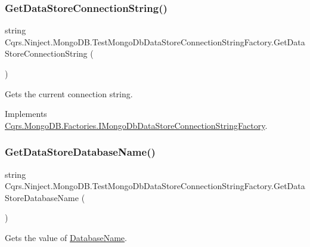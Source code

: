 \subsubsection{\texorpdfstring{Get\+Data\+Store\+Connection\+String()}{GetDataStoreConnectionString()}}
{\footnotesize\ttfamily string Cqrs.\+Ninject.\+Mongo\+D\+B.\+Test\+Mongo\+Db\+Data\+Store\+Connection\+String\+Factory.\+Get\+Data\+Store\+Connection\+String (\begin{DoxyParamCaption}{ }\end{DoxyParamCaption})}



Gets the current connection string. 



Implements \hyperlink{interfaceCqrs_1_1MongoDB_1_1Factories_1_1IMongoDbDataStoreConnectionStringFactory_a31cb87fb2cf1435912f635394494ed91_a31cb87fb2cf1435912f635394494ed91}{Cqrs.\+Mongo\+D\+B.\+Factories.\+I\+Mongo\+Db\+Data\+Store\+Connection\+String\+Factory}.

\mbox{\label{classCqrs_1_1Ninject_1_1MongoDB_1_1TestMongoDbDataStoreConnectionStringFactory_a9ef0515d08d9a309fcfef00b15dad8cf_a9ef0515d08d9a309fcfef00b15dad8cf}} 
\subsubsection{\texorpdfstring{Get\+Data\+Store\+Database\+Name()}{GetDataStoreDatabaseName()}}
{\footnotesize\ttfamily string Cqrs.\+Ninject.\+Mongo\+D\+B.\+Test\+Mongo\+Db\+Data\+Store\+Connection\+String\+Factory.\+Get\+Data\+Store\+Database\+Name (\begin{DoxyParamCaption}{ }\end{DoxyParamCaption})}



Gets the value of \hyperlink{classCqrs_1_1Ninject_1_1MongoDB_1_1TestMongoDbDataStoreConnectionStringFactory_a53412e87f2114b8a61d6898f7f290187_a53412e87f2114b8a61d6898f7f290187}{Database\+Name}. 



